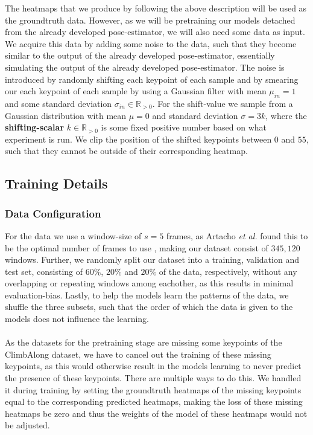 \documentclass[./main.tex]{subfiles}
\begin{document}
The heatmaps that we produce by following the above description will be used as the groundtruth data. However, as we will be pretraining our models detached from the already developed pose-estimator, we will also need some data as input. We acquire this data by adding some noise to the data, such that they become similar to the output of the already developed pose-estimator, essentially simulating the output of the already developed pose-estimator. The noise is introduced by randomly shifting each keypoint of each sample and by smearing our each keypoint of each sample by using a Gaussian filter with mean $\mu_{in} = 1$ and some standard deviation $\sigma_{in} \in \mathbb{R}_{>0}$. For the shift-value we sample from a Gaussian distribution with mean $\mu = 0$ and standard deviation $\sigma = 3k$, where the \textbf{shifting-scalar} $k \in \mathbb{R}_{>0}$ is some fixed positive number based on what experiment is run. We clip the position of the shifted keypoints between $0$ and $55$, such that they cannot be outside of their corresponding heatmap.

\subsection{Training Details}
\label{subsubsec:training_details}
\subsubsection{Data Configuration} For the data we use a window-size of $s = 5$ frames, as Artacho \textit{et al.} found this to be the optimal number of frames to use \cite{https://doi.org/10.48550/arxiv.2001.08095}, making our dataset consist of $345,120$ windows. Further, we randomly split our dataset into a training, validation and test set, consisting of $60\%$, $20\%$ and $20\%$ of the data, respectively, without any overlapping or repeating windows among eachother, as this results in minimal evaluation-bias. Lastly, to help the models learn the patterns of the data, we shuffle the three subsets, such that the order of which the data is given to the models does not influence the learning.
\\
\\
As the datasets for the pretraining stage are missing some keypoints of the ClimbAlong dataset, we have to cancel out the training of these missing keypoints, as this would otherwise result in the models learning to never predict the presence of these keypoints. There are multiple ways to do this. We handled it during training by setting the groundtruth heatmaps of the missing keypoints equal to the corresponding predicted heatmaps, making the loss of these missing heatmaps be zero and thus the weights of the model of these heatmaps would not be adjusted. 
\end{document}

